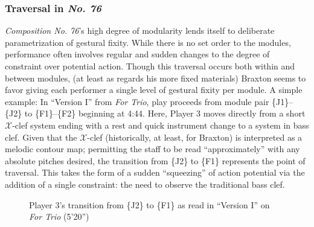     \subsubsection{Traversal in \textit{No. 76}}

        \textit{Composition No. 76}'s high degree of modularity lends itself to deliberate parametrization of gestural fixity. While there is no set order to the modules, performance often involves regular and sudden changes to the degree of constraint over potential action. Though this traversal occurs both within and between modules, (at least as regards his more fixed materials) Braxton seems to favor giving each performer a single level of gestural fixity per module. A simple example: In ``Version I'' from \textit{For Trio}, play proceeds from module pair \{J1\}--\{J2\} to \{F1\}--\{F2\} beginning at 4:44.\autocite[259]{Steinbeck_2018} Here, Player 3 moves directly from a short $\mathscr{X}$-clef system ending with a rest and quick instrument change to a system in bass clef. Given that the $\mathscr{X}$-clef (historically, at least, for Braxton) is interpreted as a melodic contour map; permitting the staff to be read ``approximately'' with any absolute pitches desired, the transition from \{J2\} to \{F1\} represents the point of traversal. This takes the form of a sudden ``squeezing'' of action potential via the addition of a single constraint: the need to observe the traditional bass clef.

            \begin{figure} 
                \centering
                \captionsetup{width=.5\textwidth}
                \caption{Player 3's transition from \{J2\} to \{F1\} as read in ``Version I'' on \textit{For Trio} (5'20'')}
                \label{fig:j2f1transition}
            \end{figure} 
        
